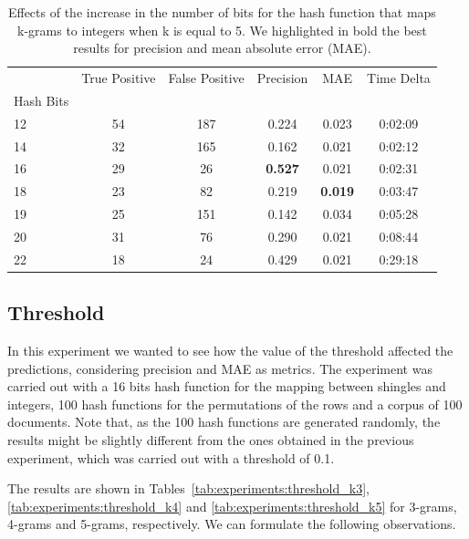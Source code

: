 \documentclass[runningheads]{llncs}
\begin{document}
\begin{table}
  \caption{Effects of the increase in the number of bits for the hash function that maps k-grams to integers when k is equal to 5. We highlighted in bold the best results for precision and mean absolute error (MAE).}
  \label{tab:experiments:buckets_k5}
  \centering
  \begin{tabular}{lccccc}
    \toprule
    {} &  True Positive &  False Positive &  Precision &    MAE & Time Delta \\
    Hash Bits &                &                 &            &        &            \\
    \midrule
    12        &             54 &             187 &      0.224 &  0.023 &    0:02:09 \\
    14        &             32 &             165 &      0.162 &  0.021 &    0:02:12 \\
    16        &             29 &              26 &      \textbf{0.527} &  0.021 &    0:02:31 \\
    18        &             23 &              82 &      0.219 &  \textbf{0.019} &    0:03:47 \\
    19        &             25 &             151 &      0.142 &  0.034 &    0:05:28 \\
    20        &             31 &              76 &      0.290 &  0.021 &    0:08:44 \\
    22        &             18 &              24 &      0.429 &  0.021 &    0:29:18 \\
    \bottomrule
    \end{tabular}
\end{table}

\subsection{Threshold}
\label{subsec:experiments:threshold}

In this experiment we wanted to see how the value of the threshold affected the predictions, considering precision and MAE as metrics. The experiment was carried out with a 16 bits hash function for the mapping between shingles and integers, 100 hash functions for the permutations of the rows and a corpus of 100 documents. Note that, as the 100 hash functions are generated randomly, the results might be slightly different from the ones obtained in the previous experiment, which was carried out with a threshold of 0.1.

The results are shown in Tables~\ref{tab:experiments:threshold_k3}, \ref{tab:experiments:threshold_k4} and \ref{tab:experiments:threshold_k5} for 3-grams, 4-grams and 5-grams, respectively. We can formulate the following observations.
\end{document}
